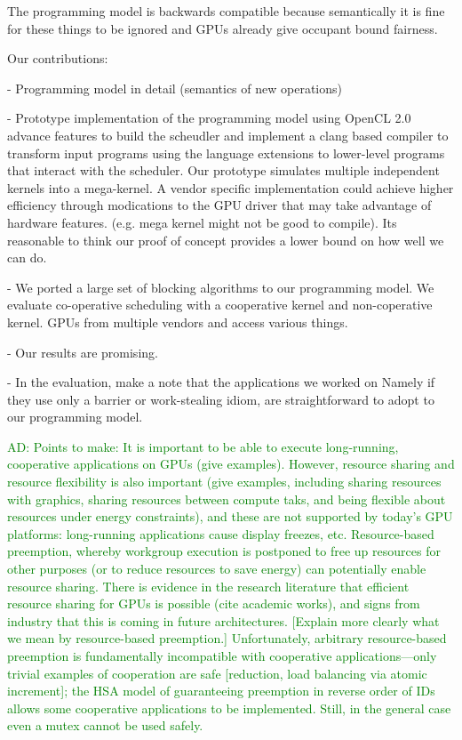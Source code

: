 \documentclass[nocopyrightspace]{sigplanconf-pldi16}
\newcommand{\ADComment}[1]{\textcolor{green}{AD: #1}}
\begin{document}
  The programming model is backwards compatible because semantically
  it is fine for these things to be ignored and GPUs already give
  occupant bound fairness. 

  Our contributions:

  - Programming model in detail (semantics of new operations)

  - Prototype implementation of the programming model using OpenCL 2.0
    advance features to build the scheudler and implement a clang
    based compiler to transform input programs using the language
    extensions to lower-level programs that interact with the
    scheduler. Our prototype simulates multiple independent kernels
    into a mega-kernel. A vendor specific implementation could achieve
    higher efficiency through modications to the GPU driver that may
    take advantage of hardware features. (e.g. mega kernel might not
    be good to compile). Its reasonable to think our proof of concept
    provides a lower bound on how well we can do.

  - We ported a large set of blocking algorithms to our programming
    model. We evaluate co-operative scheduling with a cooperative
    kernel and non-coperative kernel. GPUs from multiple vendors and
    access various things. 

  - Our results are promising.

  - In the evaluation, make a note that the applications we worked on
    Namely if they use only a barrier or work-stealing idiom, are
    straightforward to adopt to our programming model.








\ADComment{Points to make: It is important to be able to execute
  long-running, cooperative applications on GPUs (give examples).
  However, resource sharing and resource flexibility is also important
  (give examples, including sharing resources with graphics, sharing
  resources between compute taks, and being flexible about resources
  under energy constraints), and these are not supported by today's
  GPU platforms: long-running applications cause display freezes, etc.
  Resource-based preemption, whereby workgroup execution is postponed
  to free up resources for other purposes (or to reduce resources to
  save energy) can potentially enable resource sharing.  There is
  evidence in the research literature that efficient resource sharing
  for GPUs is possible (cite academic works), and signs from industry
  that this is coming in future architectures.  [Explain more clearly
    what we mean by resource-based preemption.]  Unfortunately,
  arbitrary resource-based preemption is fundamentally incompatible
  with cooperative applications---only trivial examples of cooperation
  are safe [reduction, load balancing via atomic increment]; the HSA
  model of guaranteeing preemption in reverse order of IDs allows some
  cooperative applications to be implemented.  Still, in the general
  case even a mutex cannot be used safely.}
\end{document}

